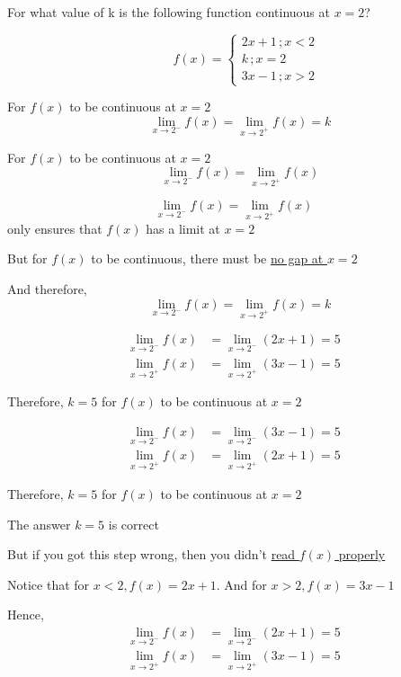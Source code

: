 \documentclass[14pt,fleqn]{extarticle}
\begin{document}
For what value of k is the following 
function continuous at $x=2$? 

%
\[\qquad f(x) = \begin{cases} 
2x + 1\, ;  x < 2 \\
k \, ;  x = 2 \\
3x - 1\, ;  x > 2
\end{cases}\]

\newcard

For $f(x)$ to be continuous at $x=2$
\[ \quad \lim_{x\to 2^-}f(x) = \lim_{x\to 2^+}f(x) = k \]
%

\newcard

For $f(x)$ to be continuous at $x=2$
\[ \quad \lim_{x\to 2^-}f(x) = \lim_{x\to 2^+}f(x)  \]
%

\newcard

\[ \lim_{x\to 2^-}f(x) = \lim_{x\to 2^+}f(x) \] only ensures
that $f(x)$ has a limit at $x = 2$\newline 

 But for $f(x)$ to be continuous, there must be \underline{no gap at $x=2$}\newline

 And therefore, 
 \[ \quad \lim_{x\to 2^-}f(x) = \lim_{x\to 2^+}f(x) = k \]

%

\newcard

\begin{align}
\lim_{x\to 2^-} f(x) &= \lim_{x\to 2^-}(2x + 1) = 5 \\
\lim_{x\to 2^+} f(x) &= \lim_{x\to 2^+}(3x - 1) = 5 
\end{align}

Therefore, $k = 5$ for $f(x)$ to be 
continuous at $x = 2$
%

\newcard

\begin{align}
\lim_{x\to 2^-} f(x) &= \lim_{x\to 2^-}(3x-1) = 5 \\
\lim_{x\to 2^+} f(x) &= \lim_{x\to 2^+}(2x+1) = 5 
\end{align}

Therefore, $k = 5$ for $f(x)$ to be 
continuous at $x = 2$
%

\newcard

The answer $k = 5$ is correct\newline

But if you got this step wrong, then you didn't \underline{read $f(x)$ properly}\newline

Notice that for $x < 2, f(x) = 2x + 1$.
And for $x > 2, f(x) = 3x - 1$\newline

Hence, 
%
\begin{align}
\lim_{x\to 2^-} f(x) &= \lim_{x\to 2^-}(2x + 1) = 5 \\
\lim_{x\to 2^+} f(x) &= \lim_{x\to 2^+}(3x - 1) = 5
\end{align}
\end{document}
